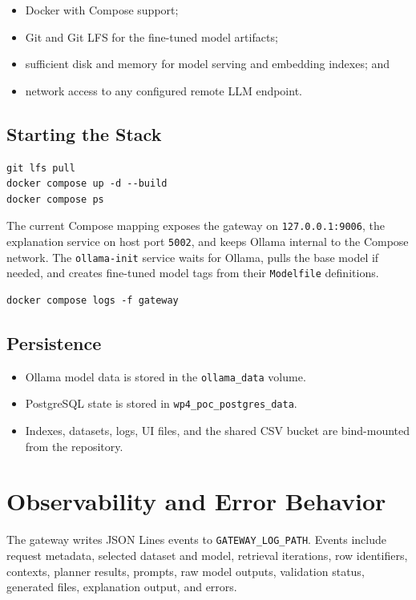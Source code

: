 \documentclass[11pt,a4paper]{article}
\newcommand{\code}[1]{\texttt{#1}}
\begin{document}
\begin{itemize}
  \item Docker with Compose support;
  \item Git and Git LFS for the fine-tuned model artifacts;
  \item sufficient disk and memory for model serving and embedding indexes; and
  \item network access to any configured remote LLM endpoint.
\end{itemize}

\subsection{Starting the Stack}

\begin{lstlisting}[style=codestyle]
git lfs pull
docker compose up -d --build
docker compose ps
\end{lstlisting}

The current Compose mapping exposes the gateway on \code{127.0.0.1:9006}, the
explanation service on host port \code{5002}, and keeps Ollama internal to the
Compose network. The \code{ollama-init} service waits for Ollama, pulls the base
model if needed, and creates fine-tuned model tags from their \code{Modelfile}
definitions.

\begin{lstlisting}[style=codestyle]
docker compose logs -f gateway
\end{lstlisting}

\subsection{Persistence}

\begin{itemize}
  \item Ollama model data is stored in the \code{ollama\_data} volume.
  \item PostgreSQL state is stored in \code{wp4\_poc\_postgres\_data}.
  \item Indexes, datasets, logs, UI files, and the shared CSV bucket are
        bind-mounted from the repository.
\end{itemize}

\section{Observability and Error Behavior}

The gateway writes JSON Lines events to \code{GATEWAY\_LOG\_PATH}. Events include
request metadata, selected dataset and model, retrieval iterations, row
identifiers, contexts, planner results, prompts, raw model outputs, validation
status, generated files, explanation output, and errors.
\end{document}
